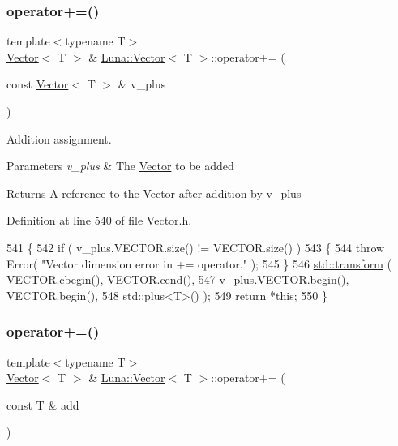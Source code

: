 \subsubsection{\texorpdfstring{operator+=()}{operator+=()}\hspace{0.1cm}{\footnotesize\ttfamily [1/2]}}
{\footnotesize\ttfamily template$<$typename T$>$ \\
\hyperlink{classLuna_1_1Vector}{Vector}$<$ T $>$ \& \hyperlink{classLuna_1_1Vector}{Luna\+::\+Vector}$<$ T $>$\+::operator+= (\begin{DoxyParamCaption}\item[{const \hyperlink{classLuna_1_1Vector}{Vector}$<$ T $>$ \&}]{v\+\_\+plus }\end{DoxyParamCaption})\hspace{0.3cm}{\ttfamily [inline]}}



Addition assignment. 


\begin{DoxyParams}{Parameters}
{\em v\+\_\+plus} & The \hyperlink{classLuna_1_1Vector}{Vector} to be added \\
\hline
\end{DoxyParams}
\begin{DoxyReturn}{Returns}
A reference to the \hyperlink{classLuna_1_1Vector}{Vector} after addition by v\+\_\+plus 
\end{DoxyReturn}


Definition at line 540 of file Vector.\+h.


\begin{DoxyCode}
541   \{
542     \textcolor{keywordflow}{if} ( v\_plus.VECTOR.size() != VECTOR.size() )
543     \{
544       \textcolor{keywordflow}{throw} Error( \textcolor{stringliteral}{"Vector dimension error in += operator."} );
545     \}
546     \hyperlink{namespaceHeat__plot_aeaa6785bedcad63b4bd40e8cb1bad8a0}{std::transform} ( VECTOR.cbegin(), VECTOR.cend(),
547                      v\_plus.VECTOR.begin(), VECTOR.begin(),
548                      std::plus<T>() );
549     \textcolor{keywordflow}{return} *\textcolor{keyword}{this};
550   \}
\end{DoxyCode}
\mbox{\label{classLuna_1_1Vector_adba6b93c812f8201980b29d3eaeca671}} 
\subsubsection{\texorpdfstring{operator+=()}{operator+=()}\hspace{0.1cm}{\footnotesize\ttfamily [2/2]}}
{\footnotesize\ttfamily template$<$typename T$>$ \\
\hyperlink{classLuna_1_1Vector}{Vector}$<$ T $>$ \& \hyperlink{classLuna_1_1Vector}{Luna\+::\+Vector}$<$ T $>$\+::operator+= (\begin{DoxyParamCaption}\item[{const T \&}]{add }\end{DoxyParamCaption})\hspace{0.3cm}{\ttfamily [inline]}}



